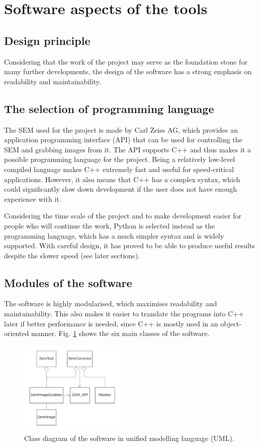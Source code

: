 \documentclass[12pt, conference]{IEEEtran}
\begin{document}
\section{Software aspects of the tools}
\subsection{Design principle}
Considering that the work of the project may serve as the foundation stone for many further developments, the design of the software has a strong emphasis on readability and maintainability.

\subsection{The selection of programming language}
The SEM used for the project is made by Carl Zeiss AG, which provides an application programming interface (API) that can be used for controlling the SEM and grabbing images from it. The API supports C++ and thus makes it a possible programming language for the project. Being a relatively low-level compiled language makes C++ extremely fast and useful for speed-critical applications. However, it also means that C++ has a complex syntax, which could significantly slow down development if the user does not have enough experience with it.

Considering the time scale of the project and to make development easier for people who will continue the work, Python is selected instead as the programming language, which has a much simpler syntax and is widely supported. With careful design, it has proved to be able to produce useful results despite the slower speed (see later sections).

\subsection{Modules of the software}
The software is highly modularised, which maximises readability and maintainability. This also makes it easier to translate the programs into C++ later if better performance is needed, since C++ is mostly used in an object-oriented manner. Fig. \ref{Software class diagram} shows the six main classes of the software.

\begin{figure}[htbp]
    \centering
    \includegraphics[width=0.45\textwidth]{Images/Software class diagram.png}
    \caption{Class diagram of the software in unified modelling language (UML).}
    \label{Software class diagram}
\end{figure}
\end{document}
